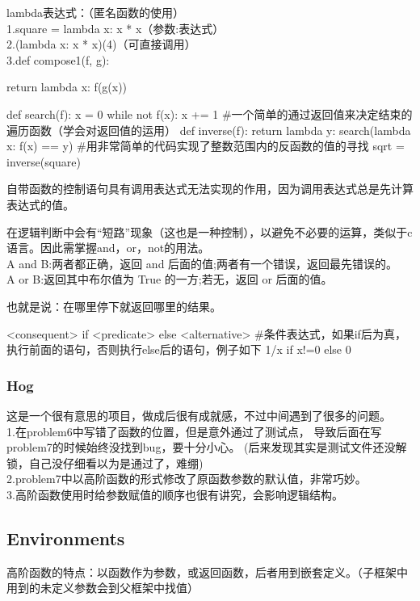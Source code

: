 \documentclass{ctexart}
\begin{document}
lambda表达式：（匿名函数的使用）
\\1.square = lambda x: x * x（参数:表达式）
\\2.(lambda x: x * x)(4)（可直接调用）
\\3.def compose1(f, g):

return lambda x: f(g(x))
\begin{python}
    def search(f):
        x = 0
        while not f(x):
            x += 1
#一个简单的通过返回值来决定结束的遍历函数（学会对返回值的运用）
    def inverse(f):
        return lambda y: search(lambda x: f(x) == y)
#用非常简单的代码实现了整数范围内的反函数的值的寻找
    sqrt = inverse(square)
\end{python}

自带函数的控制语句具有调用表达式无法实现的作用，因为调用表达式总是先计算表达式的值。

在逻辑判断中会有“短路”现象（这也是一种控制），以避免不必要的运算，类似于c语言。因此需掌握and，or，not的用法。
\\A and B:两者都正确，返回 and 后面的值;两者有一个错误，返回最先错误的。
\\A or B:返回其中布尔值为 True 的一方;若无，返回 or 后面的值。

也就是说：在哪里停下就返回哪里的结果。

\begin{python}
    <consequent> if <predicate> else <alternative>
    #条件表达式，如果if后为真，执行前面的语句，否则执行else后的语句，例子如下
    1/x if x!=0 else 0
\end{python}
\subsubsection{Hog}
这是一个很有意思的项目，做成后很有成就感，不过中间遇到了很多的问题。
\\1.在problem6中写错了函数的位置，但是意外通过了测试点，
导致后面在写problem7的时候始终没找到bug，要十分小心。
(后来发现其实是测试文件还没解锁，自己没仔细看以为是通过了，难绷)
\\2.problem7中以高阶函数的形式修改了原函数参数的默认值，非常巧妙。
\\3.高阶函数使用时给参数赋值的顺序也很有讲究，会影响逻辑结构。
\subsection{Environments}
高阶函数的特点：以函数作为参数，或返回函数，后者用到嵌套定义。（子框架中用到的未定义参数会到父框架中找值）
\end{document}
